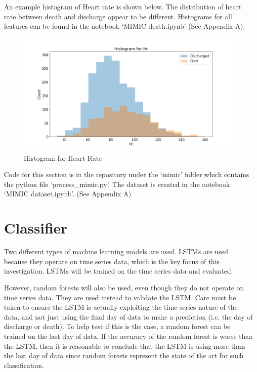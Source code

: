 \documentclass[12pt]{article}
\begin{document}
An example histogram of Heart rate is shown below. The distribution of heart rate between death and discharge appear to be different. Histograms for all features can be found in the notebook `MIMIC death.ipynb' (See Appendix A).

\begin{figure}[H]
\centering\caption{Histogram for Heart Rate}
\includegraphics[scale=0.45]{Histogram for Hr.png}
\end{figure}

Code for this section is in the repository under the `mimic' folder which contains the python file `process\_mimic.py'. The dataset is created in the notebook `MIMIC dataset.ipynb'. (See Appendix A)

\section{Classifier}

Two different types of machine learning models are used. LSTMs are used because they operate on time series data, which is the key focus of this investigation. LSTMs will be trained on the time series data and evaluated. 

However, random forests will also be used, even though they do not operate on time series data. They are used instead to validate the LSTM. Care must be taken to ensure the LSTM is actually exploiting the time series nature of the data, and not just using the final day of data to make a prediction (i.e. the day of discharge or death). To help test if this is the case, a random forest can be trained on the last day of data. If the accuracy of the random forest is worse than the LSTM, then it is reasonable to conclude that the LSTM is using more than the last day of data since random forests represent the state of the art for such classification. 
\end{document}
